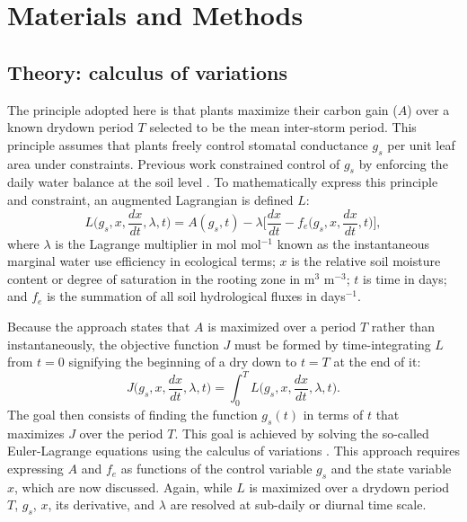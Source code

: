 \documentclass[utf8]{frontiersSCNS} %
\begin{document}
\section{Materials and Methods}

\subsection{Theory: calculus of variations}

The principle adopted here is that plants maximize their carbon gain ($A$) over a known drydown period $T$ selected to be the mean inter-storm period. This principle assumes that plants freely control stomatal conductance $g_s$ per unit leaf area under constraints. Previous work constrained control of $g_s$ by enforcing the daily water balance at the soil level \citep{manzoni_optimization_2013}. To mathematically express this principle and constraint, an augmented Lagrangian is defined $L$:
\begin{equation}
    \label{eqn:Lagrangian}
    L\Big(g_s, x, \frac{dx}{dt}, \lambda, t\Big) = A(g_s, t) - \lambda \Bigg[ \frac{dx}{dt} - f_e\Big(g_s, x, \frac{dx}{dt}, t\Big)\Bigg],
\end{equation}
where $\lambda$ is the Lagrange multiplier in mol mol$^{-1}$ known as the instantaneous marginal water use efficiency in ecological terms; $x$ is the relative soil moisture content or degree of saturation in the rooting zone in m$^3$ m$^{-3}$; $t$ is time in days; and $f_e$ is the summation of all soil hydrological fluxes in days$^{-1}$.

Because the approach states that $A$ is maximized over a period $T$ rather than instantaneously, the objective function $J$ must be formed by time-integrating $L$ from $t=0$ signifying the beginning of a dry down to $t=T$ at the end of it:
\begin{equation}
    \label{eqn:Objective}
    J\Big(g_s, x, \frac{dx}{dt}, \lambda, t\Big) = \int_0^T L\Big(g_s, x, \frac{dx}{dt}, \lambda, t\Big).
\end{equation}
The goal then consists of finding the function $g_s(t)$ in terms of $t$ that maximizes $J$ over the period $T$. This goal is achieved by solving the so-called Euler-Lagrange equations using the calculus of variations \citep{witelski_variational_2015}. This approach requires expressing $A$ and $f_e$ as functions of the control variable $g_s$ and the state variable $x$, which are now discussed. Again, while $L$ is maximized over a drydown period $T$, $g_s$, $x$, its derivative, and $\lambda$ are resolved at sub-daily or diurnal time scale.
\end{document}
